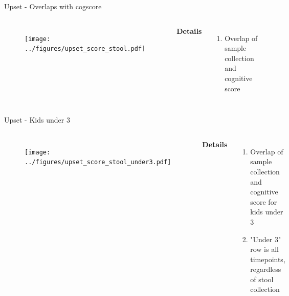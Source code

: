 
\begin{frame}{Upset - Overlaps with cogscore}
    \begin{columns}[c] %

    
        \begin{figure}
        \texttt{[image: ../figures/upset\_score\_stool.pdf]}
        \end{figure}

    
        \textbf{Details}
        \begin{enumerate}
            \item Overlap of sample collection and cognitive score
        \end{enumerate}

    \end{columns}

\end{frame}

\begin{frame}{Upset - Kids under 3}
    \begin{columns}[c] %

    
        \begin{figure}
        \texttt{[image: ../figures/upset\_score\_stool\_under3.pdf]}
        \end{figure}

    
        \textbf{Details}
        \begin{enumerate}
            \item Overlap of sample collection and cognitive score for kids under 3
            \item "Under 3" row is all timepoints, regardless of stool collection
        \end{enumerate}

    \end{columns}

\end{frame}

